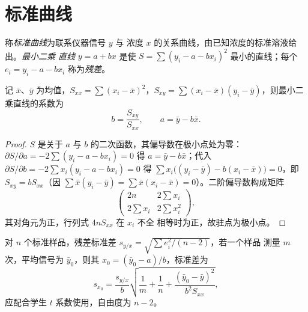 \section{标准曲线}

\begin{definition}[标准曲线]\label{def:b2:measurement-statistics:calibration}
称\emph{标准曲线}为联系仪器信号 $y$ 与
浓度 $x$ 的关系曲线，由已知浓度的标准溶液给出。\emph{最小二乘
直线} $y = a + bx$ 是使 $S = \sum (y_i - a -
bx_i)^2$ 最小的直线；每个 $e_i = y_i - a - bx_i$ 称为\emph{残差}。
\end{definition}

\begin{theorem}[最小二乘直线]\label{thm:b2:measurement-statistics:least-squares}
记 $\bar x$、$\bar y$ 为均值，$S_{xx} = \sum(x_i - \bar x)^2$，$S_{xy} = \sum(x_i - \bar x)(y_i -
\bar y)$，则最小二乘直线的系数为
\begin{equation*}
b = \frac{S_{xy}}{S_{xx}}, \qquad a = \bar y - b\bar x.
\end{equation*}
\end{theorem}

\begin{proof}
$S$ 是关于 $a$ 与 $b$ 的二次函数，其偏导数在极小点处为零：
$\partial S/\partial a = -2\sum(y_i - a - bx_i) = 0$ 得 $a = \bar y - b\bar x$；代入
$\partial S/\partial b = -2\sum x_i(y_i - a - bx_i) = 0$ 得 $\sum x_i\bigl((y_i - \bar y) - b(x_i -
\bar x)\bigr) = 0$，即 $S_{xy} = bS_{xx}$（因 $\sum \bar x(y_i - \bar y) = \sum \bar x(x_i - \bar
x) = 0$）。二阶偏导数构成矩阵
\[\begin{pmatrix} 2n & 2\sum x_i\\ 2\sum x_i & 2\sum x_i^2\end{pmatrix},\]
其对角元为正，行列式 $4nS_{xx}$ 在 $x_i$ 不全
相等时为正，故驻点为极小点。
\end{proof}

\begin{proposition}[由标准曲线读取浓度]\label{prop:b2:measurement-statistics:interpolation}
对 $n$ 个标准样品，残差标准差 $s_{y/x} = \sqrt{\sum e_i^2/(n-2)}$，若一个样品
测量 $m$ 次，平均信号为 $\bar y_0$，则其 $x_0 = (\bar y_0 - a)/b$，标准差为
\begin{equation*}
s_{x_0} = \frac{s_{y/x}}{b}\sqrt{\frac1m + \frac1n + \frac{(\bar y_0 - \bar y)^2}{b^2S_{xx}}},
\end{equation*}
应配合学生 $t$ 系数使用，自由度为 $n - 2$。
\end{proposition}

